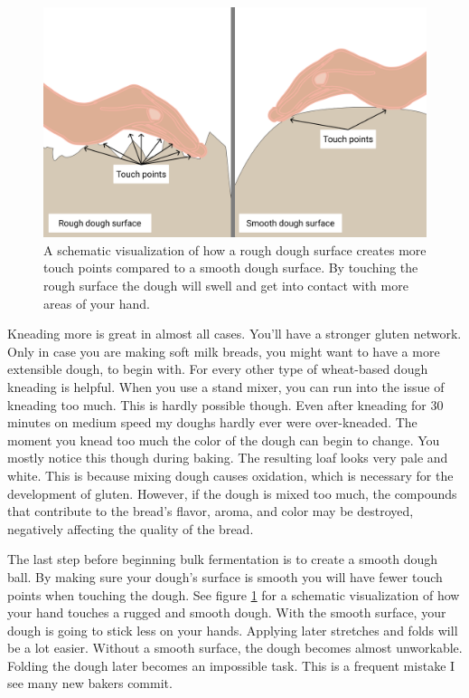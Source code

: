 \begin{figure}[!htb]
  \includegraphics[width=\textwidth]{dough-surface-touchpoints}
  \caption{A schematic visualization of how a rough dough surface
  creates more touch points compared to a smooth dough surface.
  By touching the rough surface the dough will swell and get into
  contact with more areas of your hand.
  }
  \label{fig:dough-touch-points}
\end{figure}

Kneading more is great in almost all cases. You'll have a stronger
gluten network. Only in case you are making soft milk breads, you
might want to have a more extensible dough, to begin with. For every
other type of wheat-based dough kneading is helpful. When you use
a stand mixer, you can run into the issue of kneading too much. This
is hardly possible though. Even after kneading for 30 minutes on medium
speed my doughs hardly ever were over-kneaded. The moment you knead
too much the color of the dough can begin to change. You mostly
notice this though during baking. The resulting loaf looks very
pale and white. This is because mixing dough causes oxidation,
which is necessary for the development of gluten.
However, if the dough is mixed too much, the compounds that contribute
to the bread's flavor, aroma, and color may be destroyed, negatively
affecting the quality of the bread.\cite{oxidization+dough}

The last step before beginning bulk fermentation is to
create a smooth dough ball. By making sure your dough's surface is
smooth you will have fewer touch points when touching the dough.
See figure \ref{fig:dough-touch-points} for a schematic visualization
of how your hand touches a rugged and smooth dough.
With the smooth surface, your dough is going to stick less on your hands. Applying
later stretches and folds will be a lot easier. Without a smooth
surface, the dough becomes almost unworkable. Folding the dough later
becomes an impossible task. This is a frequent mistake I see many
new bakers commit.

